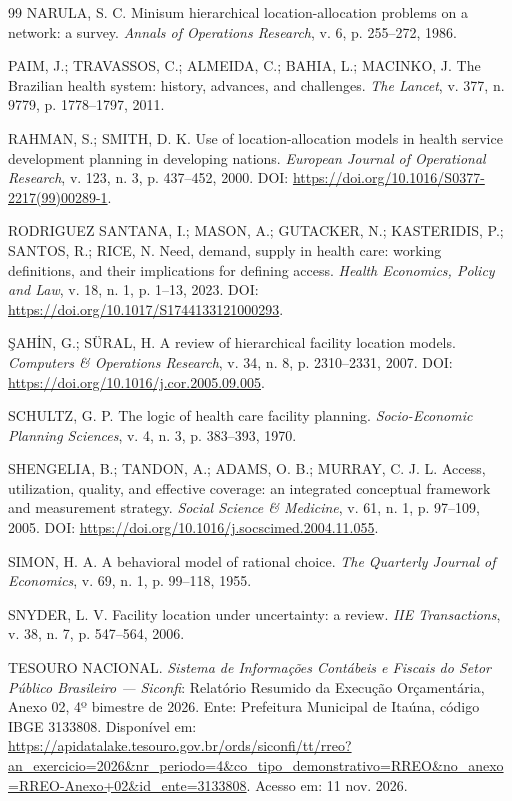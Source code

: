 \documentclass[12pt,a4paper,oneside]{report}
\begin{document}
\begin{thebibliography}{99}
NARULA, S. C. Minisum hierarchical location-allocation problems on a network: a survey. \textit{Annals of Operations Research}, v. 6, p. 255--272, 1986.

PAIM, J.; TRAVASSOS, C.; ALMEIDA, C.; BAHIA, L.; MACINKO, J. The Brazilian health system: history, advances, and challenges. \textit{The Lancet}, v. 377, n. 9779, p. 1778--1797, 2011.

RAHMAN, S.; SMITH, D. K. Use of location-allocation models in health service development planning in developing nations. \textit{European Journal of Operational Research}, v. 123, n. 3, p. 437--452, 2000. DOI: \url{https://doi.org/10.1016/S0377-2217(99)00289-1}.

RODRIGUEZ SANTANA, I.; MASON, A.; GUTACKER, N.; KASTERIDIS, P.; SANTOS, R.; RICE, N. Need, demand, supply in health care: working definitions, and their implications for defining access. \textit{Health Economics, Policy and Law}, v. 18, n. 1, p. 1--13, 2023. DOI: \url{https://doi.org/10.1017/S1744133121000293}.

\c{S}AH\.{I}N, G.; SÜRAL, H. A review of hierarchical facility location models. \textit{Computers \& Operations Research}, v. 34, n. 8, p. 2310--2331, 2007. DOI: \url{https://doi.org/10.1016/j.cor.2005.09.005}.

SCHULTZ, G. P. The logic of health care facility planning. \textit{Socio-Economic Planning Sciences}, v. 4, n. 3, p. 383--393, 1970.

SHENGELIA, B.; TANDON, A.; ADAMS, O. B.; MURRAY, C. J. L. Access, utilization, quality, and effective coverage: an integrated conceptual framework and measurement strategy. \textit{Social Science \& Medicine}, v. 61, n. 1, p. 97--109, 2005. DOI: \url{https://doi.org/10.1016/j.socscimed.2004.11.055}.

SIMON, H. A. A behavioral model of rational choice. \textit{The Quarterly Journal of Economics}, v. 69, n. 1, p. 99--118, 1955.

SNYDER, L. V. Facility location under uncertainty: a review. \textit{IIE Transactions}, v. 38, n. 7, p. 547--564, 2006.

TESOURO NACIONAL. \textit{Sistema de Informações Contábeis e Fiscais do Setor Público Brasileiro --- Siconfi}: Relatório Resumido da Execução Orçamentária, Anexo 02, 4º bimestre de 2026. Ente: Prefeitura Municipal de Itaúna, código IBGE 3133808. Disponível em: \url{https://apidatalake.tesouro.gov.br/ords/siconfi/tt/rreo?an_exercicio=2026&nr_periodo=4&co_tipo_demonstrativo=RREO&no_anexo=RREO-Anexo+02&id_ente=3133808}. Acesso em: 11 nov. 2026.

\end{thebibliography}


\end{document}
